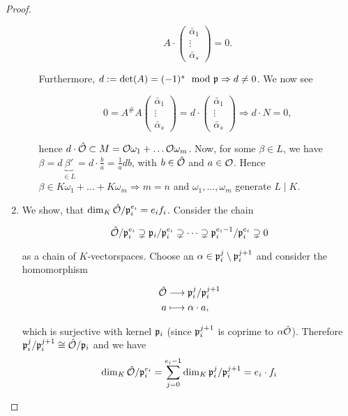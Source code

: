 \begin{proof}
\begin{enumerate}[Step 1:]
\begin{enumerate}[(1)]
			 \[
			 A \cdot
			 \begin{pmatrix}
			 	\bar\alpha_1 \\
			 	\vdots \\
			 	\bar\alpha_s
			 \end{pmatrix}
			 = 0.	 
			 \]
			 
			 Furthermore, $d:=\det(A) = (-1)^s \mod {\mathfrak{p}} \Rightarrow d \neq 0$. We now see
			 
			 \[
			 0 = A^\#A
			 \begin{pmatrix}
			 \bar\alpha_1 \\
			 \vdots \\
			 \bar\alpha_s
			 \end{pmatrix}	 
			 = d \cdot
			 \begin{pmatrix}
			 \bar\alpha_1 \\
			 \vdots \\
			 \bar\alpha_s
			 \end{pmatrix}		 
			 \Longrightarrow d \cdot N = 0,
			 \]
			 
			 hence $d \cdot \hat{\mathcal{O}} \subset M = \mathcal{O}\omega_1 + \dots \mathcal{O}\omega_m$.
			 Now, for some $\beta \in L$, we have $\beta = d\underbrace{\beta'}_{\in L} = d \cdot \frac{b}{a} = \frac{1}{a}db$, with $b \in \hat{\mathcal{O}}$ and $a \in \mathcal{O}$. Hence $\beta \in K\omega_1 + \dots + K\omega_m \Rightarrow m = n$ and $\omega_1, \dots, \omega_m$ generate $L \mid K$.			 
		\end{enumerate}
		
		\bigskip
		
		 \item We show, that $\dim_K \hat{\mathcal{O}}/\mathfrak{p}_i^{e_i} = e_if_i$. Consider the chain
		 
		 \[
		 \hat{\mathcal{O}}/\mathfrak{p}_i^{e_i} \supsetneq \mathfrak{p}_i/\mathfrak{p}_i^{e_i} \supsetneq \dots \supsetneq \mathfrak{p}_i^{e_i-1}/\mathfrak{p}_i^{e_i} \supsetneq 0
		  \]
		  
		  as a chain of $K$-vectorspaces. Choose an $\alpha \in \mathfrak{p}_i^j \setminus \mathfrak{p}_i^{j+1}$ and consider the homomorphism
		  
		  \[
		  \begin{aligned}
		   \hat{\mathcal{O}} &\longrightarrow \mathfrak{p}_i^j/\mathfrak{p}_i^{j+1} \\
		   a &\longmapsto \alpha \cdot a,
		   \end{aligned}
		   \]
		   
		  which is surjective with kernel $\mathfrak{p}_i$ (since $\mathfrak{p}_i^{j+1}$ is coprime to $\alpha \hat{\mathcal{O}}$). Therefore $\mathfrak{p}_i^j / \mathfrak{p}_i^{j+1} \cong \hat{\mathcal{O}} / \mathfrak{p}_i$ and we have
		  \[  \dim_K \hat{\mathcal{O}}/\mathfrak{p}_i^{e_i} = \sum_{j=0}^{e_i-1} \dim_K \mathfrak{p}_i^j / \mathfrak{p}_i^{j+1} = e_i \cdot f_i  \]	   	
	\end{enumerate}
\end{proof}